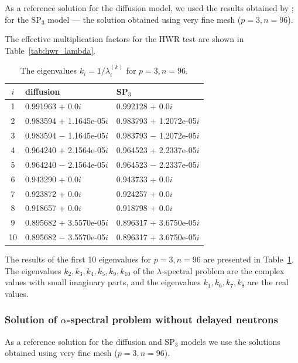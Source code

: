 \documentclass[authoryear]{elsarticle}
\begin{document}
As a reference solution for the diffusion model, we used the  results obtained by \citep{chao1995}; for the $\mathrm{SP_3}$ model --- the solution obtained using very fine mesh ($p = 3, n = 96$).

The effective multiplication factors for the HWR test are shown in Table~\ref{tab:hwr_lambda}. 

\begin{table}[h]
\caption{The eigenvalues $k_i=1/\lambda_i^{(k)}$ for $p=3, n=96$.}
\label{tab:hwr_lambda_10}
\begin{center}
\begin{tabular}{c l l }
\hline
$i$ & diffusion & SP$_3$  \\
\hline
1 & 0.991963 + 0.0$i$   & 0.992128 + 0.0$i$\\
2 & 0.983594 + 1.1645e-05$i$   & 0.983793 + 1.2072e-05$i$\\
3 & 0.983594 $-$ 1.1645e-05$i$ & 0.983793 $-$ 1.2072e-05$i$\\
4 & 0.964240 + 2.1564e-05$i$   & 0.964523 + 2.2337e-05$i$\\
5 & 0.964240 $-$ 2.1564e-05$i$ & 0.964523 $-$ 2.2337e-05$i$\\
6 & 0.943290 + 0.0$i$   & 0.943733 + 0.0$i$\\
7 & 0.923872 + 0.0$i$   & 0.924257 + 0.0$i$\\
8 & 0.918657 + 0.0$i$   & 0.918798 + 0.0$i$\\
9 & 0.895682 + 3.5570e-05$i$   & 0.896317 + 3.6750e-05$i$\\
10 & 0.895682 $-$ 3.5570e-05$i$& 0.896317 + 3.6750e-05$i$\\
\hline
\end{tabular}
\end{center}
\end{table}

The results of the first 10 eigenvalues for $ p = 3, n = 96 $ are presented in Table~\ref{tab:hwr_lambda_10}.
The eigenvalues $k_2, k_3, k_4, k_5, k_9, k_{10}$ of the $\lambda$-spectral problem are the complex values with small imaginary parts, and the eigenvalues $k_1, k_6, k_7, k_8$ are the real values. 

\subsubsection{Solution of $\alpha$-spectral problem without delayed neutrons}
As a reference solution for the diffusion and $\mathrm{SP_3}$ models we use the solutions obtained using very fine mesh ($p = 3, n = 96$).
\end{document}
